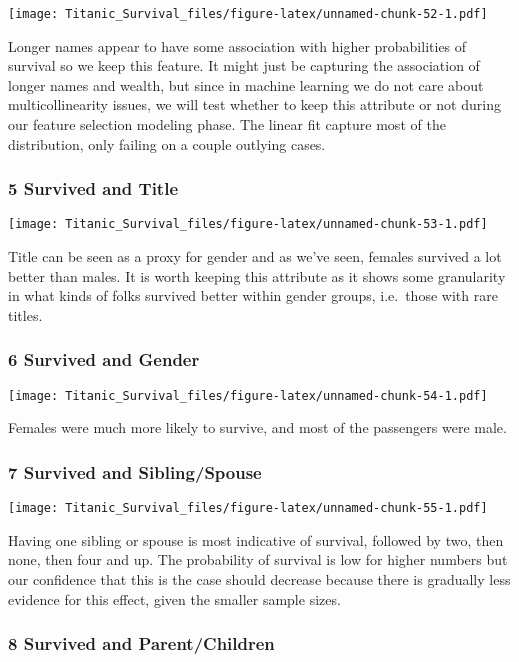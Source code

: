 \documentclass[]{article}
\begin{document}
\texttt{[image: Titanic\_Survival\_files/figure-latex/unnamed-chunk-52-1.pdf]}

Longer names appear to have some association with higher probabilities
of survival so we keep this feature. It might just be capturing the
association of longer names and wealth, but since in machine learning we
do not care about multicollinearity issues, we will test whether to keep
this attribute or not during our feature selection modeling phase. The
linear fit capture most of the distribution, only failing on a couple
outlying cases.

\subsubsection{5 Survived and Title}\label{survived-and-title}

\texttt{[image: Titanic\_Survival\_files/figure-latex/unnamed-chunk-53-1.pdf]}

Title can be seen as a proxy for gender and as we've seen, females
survived a lot better than males. It is worth keeping this attribute as
it shows some granularity in what kinds of folks survived better within
gender groups, i.e.~those with rare titles.

\subsubsection{6 Survived and Gender}\label{survived-and-gender}

\texttt{[image: Titanic\_Survival\_files/figure-latex/unnamed-chunk-54-1.pdf]}

Females were much more likely to survive, and most of the passengers
were male.

\subsubsection{7 Survived and
Sibling/Spouse}\label{survived-and-siblingspouse}

\texttt{[image: Titanic\_Survival\_files/figure-latex/unnamed-chunk-55-1.pdf]}

Having one sibling or spouse is most indicative of survival, followed by
two, then none, then four and up. The probability of survival is low for
higher numbers but our confidence that this is the case should decrease
because there is gradually less evidence for this effect, given the
smaller sample sizes.

\subsubsection{8 Survived and
Parent/Children}\label{survived-and-parentchildren}
\end{document}
